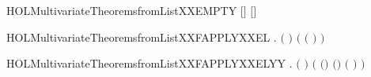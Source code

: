 \begin{SaveVerbatim}{HOLMultivariateTheoremsfromListXXEMPTY}
\HOLTokenTurnstile{}  \ensuremath{[}\ensuremath{]} \ensuremath{[}\ensuremath{]} \HOLSymConst{\ensuremath{=}} 
\end{SaveVerbatim}
\newcommand{\HOLMultivariateTheoremsfromListXXEMPTY}{\UseVerbatim{HOLMultivariateTheoremsfromListXXEMPTY}}
\begin{SaveVerbatim}{HOLMultivariateTheoremsfromListXXFAPPLYXXEL}
\HOLTokenTurnstile{} \HOLSymConst{\HOLTokenForall{}}  .
         \HOLSymConst{\HOLTokenConj{}} \ensuremath{(}  \HOLSymConst{\ensuremath{=}}  \ensuremath{)} \HOLSymConst{\HOLTokenConj{}}  \HOLSymConst{\HOLTokenLt{}}   \HOLSymConst{\HOLTokenImp{}}
       \ensuremath{(}    \ensuremath{(}  \ensuremath{)} \HOLSymConst{\ensuremath{=}}   \ensuremath{)}
\end{SaveVerbatim}
\newcommand{\HOLMultivariateTheoremsfromListXXFAPPLYXXEL}{\UseVerbatim{HOLMultivariateTheoremsfromListXXFAPPLYXXEL}}
\begin{SaveVerbatim}{HOLMultivariateTheoremsfromListXXFAPPLYXXELYY}
\HOLTokenTurnstile{} \HOLSymConst{\HOLTokenForall{}}    .
       \HOLSymConst{\HOLTokenNeg{}}   \HOLSymConst{\HOLTokenConj{}}   \HOLSymConst{\HOLTokenConj{}} \ensuremath{(}  \HOLSymConst{\ensuremath{=}}  \ensuremath{)} \HOLSymConst{\HOLTokenConj{}}
        \HOLSymConst{\HOLTokenLt{}}   \HOLSymConst{\HOLTokenImp{}}
       \ensuremath{(} \ensuremath{(}\HOLSymConst{::}\ensuremath{)} \ensuremath{(}\HOLSymConst{::}\ensuremath{)}  \ensuremath{(}  \ensuremath{)} \HOLSymConst{\ensuremath{=}}   \ensuremath{)}
\end{SaveVerbatim}
\newcommand{\HOLMultivariateTheoremsfromListXXFAPPLYXXELYY}{\UseVerbatim{HOLMultivariateTheoremsfromListXXFAPPLYXXELYY}}
